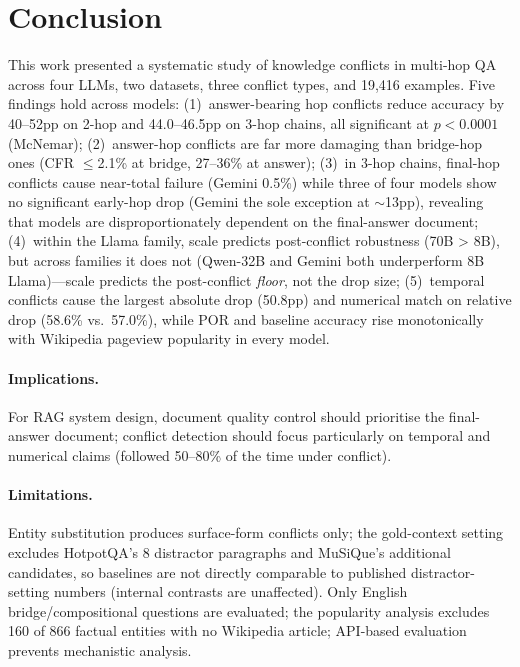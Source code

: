 \section{Conclusion}
\label{sec:conclusion}

This work presented a systematic study of knowledge conflicts in multi-hop QA across four LLMs, two datasets, three conflict types, and 19{,}416 examples. Five findings hold across models: (1)~answer-bearing hop conflicts reduce accuracy by 40--52pp on 2-hop and 44.0--46.5pp on 3-hop chains, all significant at $p < 0.0001$ (McNemar); (2)~answer-hop conflicts are far more damaging than bridge-hop ones (CFR $\leq$2.1\% at bridge, 27--36\% at answer); (3)~in 3-hop chains, final-hop conflicts cause near-total failure (Gemini 0.5\%) while three of four models show no significant early-hop drop (Gemini the sole exception at $\sim$13pp), revealing that models are disproportionately dependent on the final-answer document; (4)~within the Llama family, scale predicts post-conflict robustness (70B > 8B), but across families it does not (Qwen-32B and Gemini both underperform 8B Llama)---scale predicts the post-conflict \emph{floor}, not the drop size; (5)~temporal conflicts cause the largest absolute drop (50.8pp) and numerical match on relative drop (58.6\% vs.\ 57.0\%), while POR and baseline accuracy rise monotonically with Wikipedia pageview popularity in every model.

\paragraph{Implications.} For RAG system design, document quality control should prioritise the final-answer document; conflict detection should focus particularly on temporal and numerical claims (followed 50--80\% of the time under conflict).

\paragraph{Limitations.} Entity substitution produces surface-form conflicts only; the gold-context setting excludes HotpotQA's 8 distractor paragraphs and MuSiQue's additional candidates, so baselines are not directly comparable to published distractor-setting numbers (internal contrasts are unaffected). Only English bridge/compositional questions are evaluated; the popularity analysis excludes 160 of 866 factual entities with no Wikipedia article; API-based evaluation prevents mechanistic analysis.

